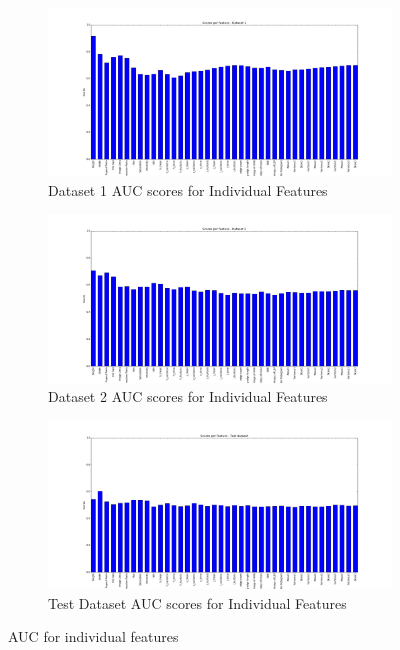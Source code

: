 \begin{figure}[h]	
	\begin{subfigure}{\textwidth}
		\includegraphics[width=\textwidth]{images/Dataset1-SVM-IndividualFeatures} 
		\caption{Dataset 1 AUC scores for Individual Features}
		\label{fig:AUC_Dataset1_individualFeature}
	\end{subfigure}
	\begin{subfigure}{\textwidth}
		\includegraphics[width=\textwidth]{images/Dataset2-SVM-IndividualFeatures}
		\caption{Dataset 2 AUC scores for Individual Features}
		\label{fig:AUC_Dataset2_individualFeature}
	\end{subfigure}
	
	\begin{subfigure}{\textwidth}
		\includegraphics[width=\textwidth]{images/TestDataset-SVM-IndividualFeatures}
		\caption{Test Dataset AUC scores for Individual Features}
		\label{fig:AUC_Dataset3_individualFeature}
	\end{subfigure}
	
	\caption{AUC for individual features}
	\label{fig:AUC_individualFeatures}
\end{figure}


